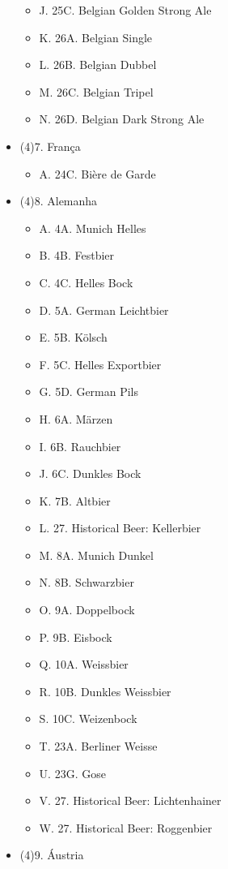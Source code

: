 \begin{multicols*}{2}
\begin{itemize}[noitemsep]
\begin{itemize}
  \item[] J. 25C. Belgian Golden Strong Ale
  \item[] K. 26A. Belgian Single
  \item[] L. 26B. Belgian Dubbel
  \item[] M. 26C. Belgian Tripel
  \item[] N. 26D. Belgian Dark Strong Ale
\end{itemize}
\item[] (4)7. França
\begin{itemize}
  \item[] A. 24C. Bière de Garde
\end{itemize}
\item[] (4)8. Alemanha
\begin{itemize}
  \item[] A. 4A. Munich Helles
  \item[] B. 4B. Festbier
  \item[] C. 4C. Helles Bock
  \item[] D. 5A. German Leichtbier
  \item[] E. 5B. Kölsch
  \item[] F. 5C. Helles Exportbier
  \item[] G. 5D. German Pils
  \item[] H. 6A. Märzen
  \item[] I. 6B. Rauchbier
  \item[] J. 6C. Dunkles Bock
  \item[] K. 7B. Altbier
  \item[] L. 27. Historical Beer: Kellerbier
  \item[] M. 8A. Munich Dunkel
  \item[] N. 8B. Schwarzbier
  \item[] O. 9A. Doppelbock
  \item[] P. 9B. Eisbock
  \item[] Q. 10A. Weissbier
  \item[] R. 10B. Dunkles Weissbier
  \item[] S. 10C. Weizenbock
  \item[] T. 23A. Berliner Weisse
  \item[] U. 23G. Gose
  \item[] V. 27. Historical Beer: Lichtenhainer
  \item[] W. 27. Historical Beer: Roggenbier
\end{itemize}
\item[] (4)9. Áustria
\begin{itemize}

\end{itemize}
\end{itemize}
\end{multicols*}
